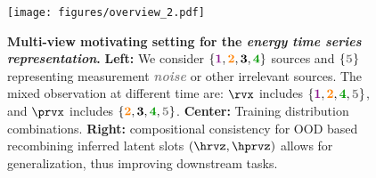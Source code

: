 \documentclass{article} %
\theoremstyle{plain}
\theoremstyle{definition}
\theoremstyle{remark}
\numberwithin{equation}{section}
\begin{document}
\begin{figure}
    \centering
    \vspace{-0.5cm}
    \texttt{[image: figures/overview\_2.pdf]}
    \vspace{-0.2cm}
    \caption{\textbf{Multi-view motivating setting for the \emph{energy time series representation}.} \textbf{Left:} We consider $\{\textcolor{magenta!50!blue}{\bf 1},\textcolor{orange}{\bf 2}, \textcolor{black}{\bf 3}, \textcolor{green!60!black}{\bf 4}\}$ sources and $\{\textcolor{gray}{\bf 5}\}$ representing measurement \textcolor{gray}{\textit{\bf noise}} or other irrelevant sources. The mixed observation at different time are: $\rvx$ includes $\{\textcolor{magenta!50!blue}{\bf 1},\textcolor{orange}{\bf 2}, \textcolor{green!60!black}{\bf 4}, \textcolor{gray}{\bf 5}\}$, and $\prvx$ includes $\{\textcolor{orange}{\bf 2}, \textcolor{black}{\bf 3}, \textcolor{green!60!black}{\bf 4}, \textcolor{gray}{\bf 5}\}$. \textbf{Center:} Training distribution combinations. \textbf{Right:} compositional consistency for OOD based recombining inferred latent slots $(\hrvz, \hprvz)$ allows for generalization, thus improving downstream tasks. \label{fig:overview}}
    \vspace{-0.6cm}
\end{figure}
\end{document}

